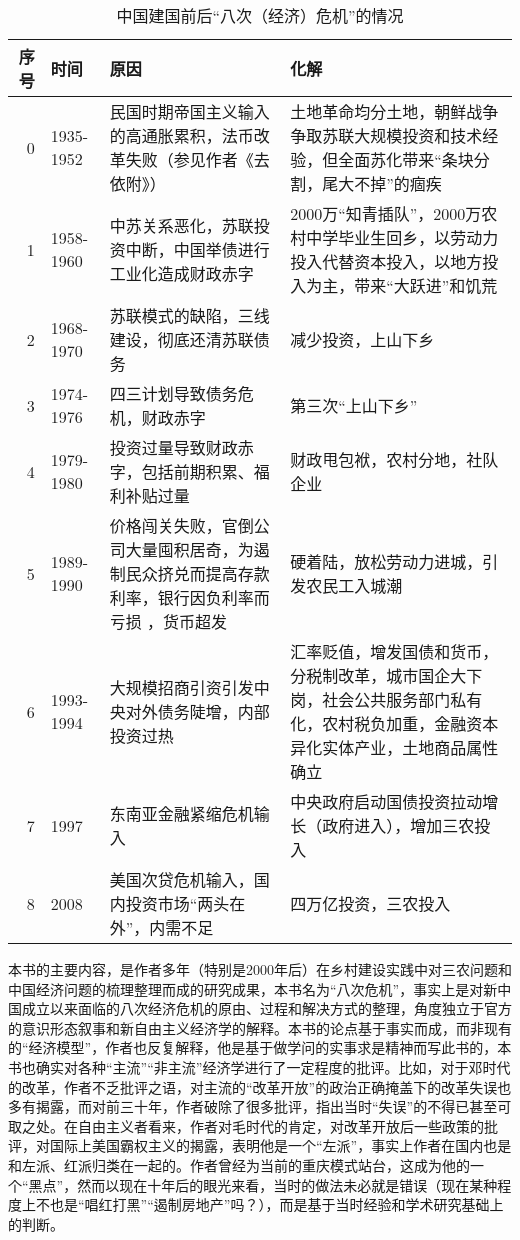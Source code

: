 \begin{longtable}{r | l | p{} | p{}}
\caption{中国建国前后“八次（经济）危机”的情况} \\
\hline
序号 & 时间 & 原因 & 化解 \\
\hline
\endhead

\hline
\endfoot

0 & 1935-1952 & 民国时期帝国主义输入的高通胀累积，法币改革失败（参见作者《去依附》） &土地革命均分土地，朝鲜战争争取苏联大规模投资和技术经验，但全面苏化带来“条块分割，尾大不掉”的痼疾 \\
1 & 1958-1960 &中苏关系恶化，苏联投资中断，中国举债进行工业化造成财政赤字 & 2000万“知青插队”，2000万农村中学毕业生回乡，以劳动力投入代替资本投入，以地方投入为主，带来“大跃进”和饥荒 \\
2 & 1968-1970 &苏联模式的缺陷，三线建设，彻底还清苏联债务 &减少投资，上山下乡 \\
3 & 1974-1976 & 四三计划导致债务危机，财政赤字 & 第三次“上山下乡” \\
4 & 1979-1980 &投资过量导致财政赤字，包括前期积累、福利补贴过量  &财政甩包袱，农村分地，社队企业 \\
5 & 1989-1990 &价格闯关失败，官倒公司大量囤积居奇，为遏制民众挤兑而提高存款利率，银行因负利率而亏损 ，货币超发&硬着陆，放松劳动力进城，引发农民工入城潮 \\
6 & 1993-1994 & 大规模招商引资引发中央对外债务陡增，内部投资过热 &汇率贬值，增发国债和货币，分税制改革，城市国企大下岗，社会公共服务部门私有化，农村税负加重，金融资本异化实体产业，土地商品属性确立 \\
7 & 1997 & 东南亚金融紧缩危机输入 & 中央政府启动国债投资拉动增长（政府进入），增加三农投入 \\
8 & 2008 & 美国次贷危机输入，国内投资市场“两头在外”，内需不足 & 四万亿投资，三农投入 \\
\end{longtable}

本书的主要内容，是作者多年（特别是2000年后）在乡村建设实践中对三农问题和中国经济问题的梳理整理而成的研究成果，本书名为“八次危机”，事实上是对新中国成立以来面临的八次经济危机的原由、过程和解决方式的整理，角度独立于官方的意识形态叙事和新自由主义经济学的解释。本书的论点基于事实而成，而非现有的“经济模型”，作者也反复解释，他是基于做学问的实事求是精神而写此书的，本书也确实对各种“主流”“非主流”经济学进行了一定程度的批评。比如，对于邓时代的改革，作者不乏批评之语，对主流的“改革开放”的政治正确掩盖下的改革失误也多有揭露，而对前三十年，作者破除了很多批评，指出当时“失误”的不得已甚至可取之处。在自由主义者看来，作者对毛时代的肯定，对改革开放后一些政策的批评，对国际上美国霸权主义的揭露，表明他是一个“左派”，事实上作者在国内也是和左派、红派归类在一起的。作者曾经为当前的重庆模式站台，这成为他的一个“黑点”，然而以现在十年后的眼光来看，当时的做法未必就是错误（现在某种程度上不也是“唱红打黑”“遏制房地产”吗？），而是基于当时经验和学术研究基础上的判断。

